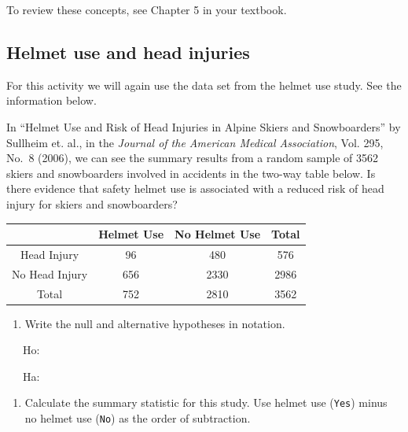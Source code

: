 \documentclass[
]{report}
\providecommand{\tightlist}{%
  \setlength{\itemsep}{0pt}\setlength{\parskip}{0pt}}
\begin{document}
To review these concepts, see Chapter 5 in your textbook.

\hypertarget{helmet-use-and-head-injuries}{%
\subsection{Helmet use and head injuries}\label{helmet-use-and-head-injuries}}

For this activity we will again use the data set from the helmet use study. See the information below.

In ``Helmet Use and Risk of Head Injuries in Alpine Skiers and Snowboarders'' by Sullheim et. al., in the \emph{Journal of the American Medical Association}, Vol. 295, No.~8 (2006), we can see the summary results from a random sample of 3562 skiers and snowboarders involved in accidents in the two-way table below. Is there evidence that safety helmet use is associated with a reduced risk of head injury for skiers and snowboarders?

\begin{longtable}[]{@{}cccc@{}}
\toprule
& Helmet Use & No Helmet Use & Total \\
\midrule
\endhead
Head Injury & 96 & 480 & 576 \\
No Head Injury & 656 & 2330 & 2986 \\
Total & 752 & 2810 & 3562 \\
\bottomrule
\end{longtable}

\begin{enumerate}
\def\labelenumi{\arabic{enumi}.}
\tightlist
\item
  Write the null and alternative hypotheses in notation.
\end{enumerate}

~~~Ho:

\vspace{0.2in}

~~~Ha:

\vspace{0.2in}

\begin{enumerate}
\def\labelenumi{\arabic{enumi}.}
\setcounter{enumi}{1}
\tightlist
\item
  Calculate the summary statistic for this study. Use helmet use (\texttt{Yes}) minus no helmet use (\texttt{No}) as the order of subtraction.
\end{enumerate}

\vspace{0.5in}
\end{document}
